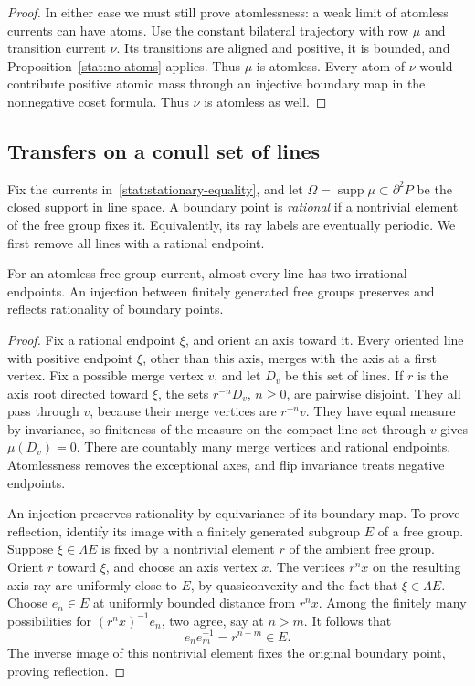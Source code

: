 \begin{proof}
In either case we must still prove atomlessness: a weak limit of
atomless currents can have atoms.  Use the constant bilateral
trajectory with row $\mu$ and transition current $\nu$.  Its
transitions are aligned and positive, it is bounded, and
Proposition~\ref{stat:no-atoms} applies.  Thus $\mu$ is atomless.
Every atom of $\nu$ would contribute positive atomic mass through an
injective boundary map in the nonnegative coset formula.  Thus $\nu$
is atomless as well.
\end{proof}

\subsection{Transfers on a conull set of lines}

Fix the currents in~\eqref{stat:stationary-equality}, and let
$\Omega=\operatorname{supp}\mu\subset\partial^2P$ be the closed
support in line space.  A boundary point is \emph{rational} if a
nontrivial element of the free group fixes it.  Equivalently, its ray
labels are eventually periodic.  We first remove all lines with a
rational endpoint.

\begin{lemma}\label{stat:irrational}
For an atomless free-group current, almost every line has two
irrational endpoints.  An injection between finitely generated free
groups preserves and reflects rationality of boundary points.
\end{lemma}
\begin{proof}
Fix a rational endpoint $\xi$, and orient an axis toward it.  Every
oriented line with positive endpoint $\xi$, other than this axis,
merges with the axis at a first vertex.  Fix a possible merge vertex
$v$, and let $D_v$ be this set of lines.  If $r$ is the axis root
directed toward $\xi$, the sets $r^{-n}D_v$, $n\ge0$, are pairwise
disjoint.  They all pass through $v$, because their merge vertices
are $r^{-n}v$.  They have equal measure by invariance, so finiteness
of the measure on the compact line set through $v$ gives
$\mu(D_v)=0$.  There are countably many merge vertices and rational
endpoints.  Atomlessness removes the exceptional axes, and flip
invariance treats negative endpoints.

An injection preserves rationality by equivariance of its boundary
map.  To prove reflection, identify its image with a finitely
generated subgroup $E$ of a free group.  Suppose $\xi\in\Lambda E$
is fixed by a nontrivial element $r$ of the ambient free group.
Orient $r$ toward $\xi$, and choose an axis vertex $x$.  The vertices
$r^n x$ on the resulting axis ray are uniformly
close to $E$, by quasiconvexity and the fact that $\xi\in\Lambda E$.
Choose $e_n\in E$ at uniformly bounded distance from $r^n x$.
Among the finitely many possibilities for
$(r^n x)^{-1}e_n$, two agree, say at $n>m$.  It follows that
\[
                        e_ne_m^{-1}=r^{n-m}\in E.
\]
The inverse image of this nontrivial element fixes the original
boundary point, proving reflection.
\end{proof}

